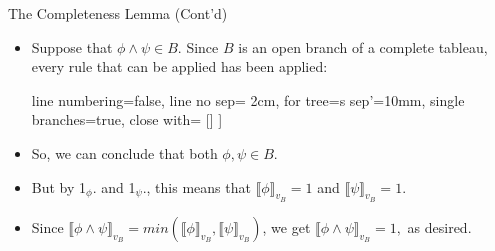 \begin{frame}{The Completeness Lemma (Cont'd)}

	\begin{itemize}
		
			\item Suppose that $\phi\land \psi\in B$. Since $B$ is an open branch of a complete tableau, every rule that can be applied has been applied:
			\begin{center}
				\begin{prooftree}
					{
					line numbering=false,
					line no sep= 2cm,
					for tree={s sep'=10mm},
					single branches=true,
					close with=\xmark
					}
					[\phi\land\psi [\phi [\psi ] ] ]
					\end{prooftree}
				\end{center}
		\item So, we can conclude that both $\phi,\psi\in B$. 
		
		\item But by 1$_\phi$. and 1$_\psi$., this means that $\llbracket\phi\rrbracket_{v_B}=1$ and $\llbracket\psi\rrbracket_{v_B}=1$. 
		
		\item Since $\llbracket\phi\land \psi\rrbracket_{v_B}=min(\llbracket\phi\rrbracket_{v_B},\llbracket\psi\rrbracket_{v_B})$, we get $\llbracket\phi\land \psi\rrbracket_{v_B}=1,$ as desired.
		
	\end{itemize}
		

\end{frame}

